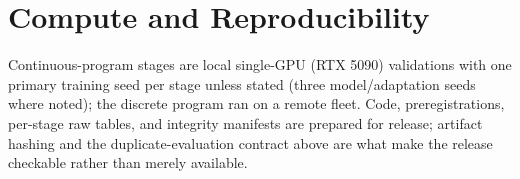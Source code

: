 \documentclass[11pt,letterpaper]{article}
\begin{document}
\section{Compute and Reproducibility}

Continuous-program stages are local single-GPU (RTX 5090) validations with one primary training seed per stage unless stated (three model/adaptation seeds where noted); the discrete program ran on a remote fleet. Code, preregistrations, per-stage raw tables, and integrity manifests are prepared for release; artifact hashing and the duplicate-evaluation contract above are what make the release checkable rather than merely available.



\end{document}
